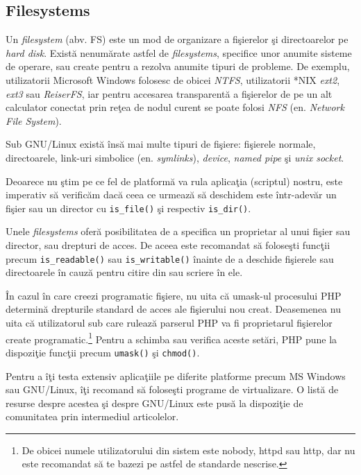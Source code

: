 \subsection{Filesystems}

Un \textsl{filesystem} (abv. FS) este un mod de organizare a fişierelor
şi directoarelor pe \textit{hard disk}. Există nenumărate
astfel de \textit{filesystems}, specifice unor anumite
sisteme de operare, sau create pentru a rezolva anumite tipuri
de probleme. De exemplu, utilizatorii Microsoft Windows folosesc
de obicei \textsl{NTFS}, utilizatorii *NIX \textsl{ext2}, \textsl{ext3}
sau \textsl{ReiserFS}, iar pentru accesarea transparentă a fişierelor
de pe un alt calculator conectat prin reţea de nodul curent se
poate folosi \textsl{NFS} (en. \textsl{Network File System}).

Sub GNU/Linux există însă mai multe tipuri de {\glqq}fişiere{\grqq}:
fişierele normale, directoarele, link-uri simbolice (en. \textsl{symlinks}),
\textsl{device}, \textsl{named pipe} şi \textsl{unix socket}.

Deoarece nu ştim pe ce fel de platformă va rula aplicaţia (scriptul)
nostru, este imperativ să verificăm dacă ceea ce urmează să deschidem
este \^intr-adevăr un fişier sau un director cu \texttt{is\_file()}
şi respectiv \texttt{is\_dir()}.

Unele \textit{filesystems} oferă posibilitatea de a specifica 
un proprietar al unui fişier sau director, sau drepturi de acces.
De aceea este recomandat să foloseşti funcţii precum \texttt{is\_readable()}
sau \texttt{is\_writable()} \^inainte de a deschide fişierele
sau directoarele \^in cauză pentru citire din sau scriere \^in ele.

\^In cazul \^in care creezi programatic fişiere, nu uita că
umask-ul procesului PHP determină drepturile standard de acces
ale fişierului nou creat. Deasemenea nu uita că utilizatorul sub
care rulează parserul PHP va fi proprietarul fişierelor create
programatic.\footnote{De obicei numele utilizatorului din sistem
este {\glqq}nobody{\grqq}, {\glqq}httpd{\grqq} sau {\glqq}http{\grqq}, dar
nu este recomandat să te bazezi pe astfel de standarde nescrise.}
Pentru a schimba sau verifica aceste setări, PHP pune la dispoziţie
funcţii precum \texttt{umask()} şi \texttt{chmod()}.

Pentru a \^iţi testa extensiv aplicaţiile pe diferite platforme
precum MS Windows sau GNU/Linux, \^iţi recomand să foloseşti
programe de virtualizare. O listă de resurse despre acestea
şi despre GNU/Linux este pusă la dispoziţie de comunitatea
{\phpro} prin intermediul articolelor.


